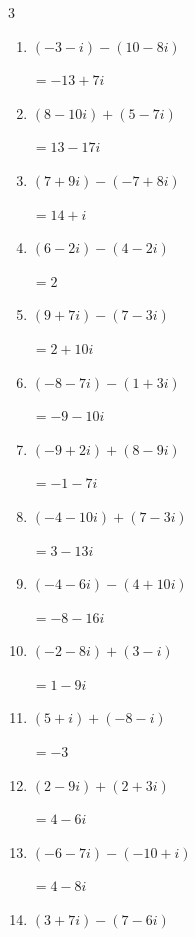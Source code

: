 \begin{multicols}{3}
\begin{enumerate}
  \item $\displaystyle (-3-i) - (10-8i)$

        $\displaystyle =-13+7i$

  \item $\displaystyle (8-10i) + (5-7i)$

        $\displaystyle =13-17i$

  \item $\displaystyle (7+9i) - (-7+8i)$

        $\displaystyle =14+i$

  \item $\displaystyle (6-2i) - (4-2i)$

        $\displaystyle =2$

  \item $\displaystyle (9+7i) - (7-3i)$

        $\displaystyle =2+10i$

  \item $\displaystyle (-8-7i) - (1+3i)$

        $\displaystyle =-9-10i$

  \item $\displaystyle (-9+2i) + (8-9i)$

        $\displaystyle =-1-7i$

  \item $\displaystyle (-4-10i) + (7-3i)$

        $\displaystyle =3-13i$

  \item $\displaystyle (-4-6i) - (4+10i)$

        $\displaystyle =-8-16i$

  \item $\displaystyle (-2-8i) + (3-i)$

        $\displaystyle =1-9i$

  \item $\displaystyle (5+i) + (-8-i)$

        $\displaystyle =-3$

  \item $\displaystyle (2-9i) + (2+3i)$

        $\displaystyle =4-6i$

  \item $\displaystyle (-6-7i) - (-10+i)$

        $\displaystyle =4-8i$

  \item $\displaystyle (3+7i) - (7-6i)$


\end{enumerate}
\end{multicols}
